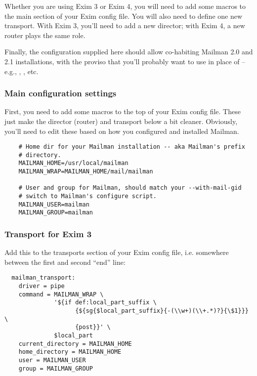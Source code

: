 \documentclass{howto}
\begin{document}
Whether you are using Exim 3 or Exim 4, you will need to add some macros to
the main section of your Exim config file.  You will also need to define one
new transport.  With Exim 3, you'll need to add a new director; with Exim 4, a
new router plays the same role.

Finally, the configuration supplied here should allow co-habiting Mailman 2.0
and 2.1 installations, with the proviso that you'll probably want to use
 in place of  -- e.g., ,
, etc.

\subsubsection{Main configuration settings}

First, you need to add some macros to the top of your Exim config file.  These
just make the director (router) and transport below a bit cleaner.  Obviously,
you'll need to edit these based on how you configured and installed Mailman.

\begin{verbatim}
    # Home dir for your Mailman installation -- aka Mailman's prefix
    # directory.
    MAILMAN_HOME=/usr/local/mailman
    MAILMAN_WRAP=MAILMAN_HOME/mail/mailman

    # User and group for Mailman, should match your --with-mail-gid
    # switch to Mailman's configure script.
    MAILMAN_USER=mailman
    MAILMAN_GROUP=mailman
\end{verbatim}

\subsubsection{Transport for Exim 3\label{exim3-transport}}

Add this to the transports section of your Exim config file,
i.e. somewhere between the first and second ``end'' line:

\begin{verbatim}
  mailman_transport:
    driver = pipe
    command = MAILMAN_WRAP \
              '${if def:local_part_suffix \
                    {${sg{$local_part_suffix}{-(\\w+)(\\+.*)?}{\$1}}} \
                    {post}}' \
              $local_part
    current_directory = MAILMAN_HOME
    home_directory = MAILMAN_HOME
    user = MAILMAN_USER
    group = MAILMAN_GROUP
\end{verbatim}
\end{document}
